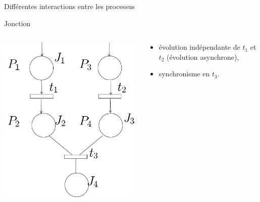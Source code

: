 \documentclass[compress]{beamer}
\begin{document}
\begin{frame}{Différentes interactions entre les processus}
\begin{block}{Jonction}
\begin{columns}
	\begin{column}{.3\linewidth}
		\begin{center}
			\includegraphics[width=\linewidth]{jun}
		\end{center}
	\end{column}
	\begin{column}{.7\linewidth}
		\begin{itemize}
		\item évolution indépendante de $t_1$ et $t_2$ (évolution asynchrone),
		\item synchronisme en $t_3$.
		\end{itemize}
	\end{column}
\end{columns}
\end{block}
\end{frame}
\end{document}
